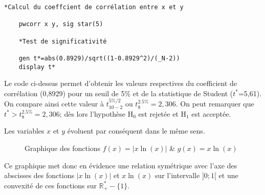 


\begin{lstlisting}[style=stata, label={lst:stata}]
	*Calcul du coeffcient de corrélation entre x et y
	
	pwcorr x y, sig star(5)
	
	*Test de significativité
	
	gen t*=abs(0.8929)/sqrt((1-0.8929^2)/(_N-2))
	display t*
\end{lstlisting}

Le code ci-dessus permet d'obtenir les valeurs respectives du coefficient de corrélation (0,8929) pour un seuil de 5\% et de la statistique de Student ($t^*$=5,61). On compare ainsi cette valeur à $\displaystyle t_{10-2}^{5\%/2}$ ou $\displaystyle  t_{8}^{2.5\%}=2,306$. On peut remarquer que $\displaystyle t^*>t_{8}^{2.5\%}=2,306$; dès lors l'hypothèse H$_0$ est rejetée et H$_1$ est acceptée.

Les variables $x$ et $y$ évoluent par conséquent dans le même sens.

 \begin{figure}[h]
	\begin{center}
	\end{center}
	\caption{Graphique des fonctions $\displaystyle f(x)=\lvert x\ln(x) \rvert$ \& $\displaystyle g(x)=x\ln(x)$}
\end{figure}

Ce graphique met donc en évidence une relation symétrique avec l'axe des abscisses des fonctions $|x\ln(x)|$ et $x\ln(x)$ sur l'intervalle $]0;1[$ et une convexité de ces fonctions sur $\mathbb{R}^{*}_{+}-\{1\}$.